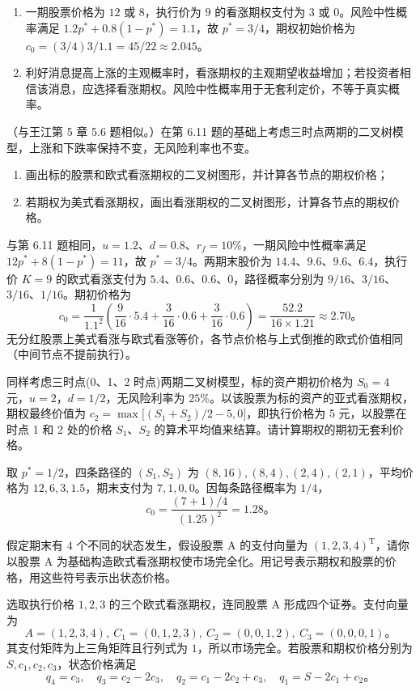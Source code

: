 \begin{solution}
\begin{enumerate}[label=(\alph*)]
\item 一期股票价格为 $12$ 或 $8$，执行价为 $9$ 的看涨期权支付为 $3$ 或 $0$。风险中性概率满足 $1.2p^*+0.8(1-p^*)=1.1$，故 $p^*=3/4$，期权初始价格为 $c_0=(3/4)3/1.1=45/22\approx2.045$。
\item 利好消息提高上涨的主观概率时，看涨期权的主观期望收益增加；若投资者相信该消息，应选择看涨期权。风险中性概率用于无套利定价，不等于真实概率。
\end{enumerate}
\end{solution}
\begin{problem}
（与王江第 5 章 5.6 题相似。）在第 6.11 题的基础上考虑三时点两期的二叉树模型，上涨和下跌率保持不变，无风险利率也不变。
\begin{enumerate}[label=(\alph*)]
    \item 画出标的股票和欧式看涨期权的二叉树图形，并计算各节点的期权价格；
    \item 若期权为美式看涨期权，画出看涨期权的二叉树图形，计算各节点的期权价格。
\end{enumerate}
\end{problem}
\begin{solution}
与第 6.11 题相同，$u=1.2$、$d=0.8$、$r_f=10\%$，一期风险中性概率满足 $12p^*+8(1-p^*)=11$，故 $p^*=3/4$。两期末股价为 $14.4$、$9.6$、$9.6$、$6.4$，执行价 $K=9$ 的欧式看涨支付为 $5.4$、$0.6$、$0.6$、$0$，路径概率分别为 $9/16$、$3/16$、$3/16$、$1/16$。期初价格为
\[
c_0=\frac{1}{1.1^2}\left(\frac{9}{16}\cdot5.4+\frac{3}{16}\cdot0.6+\frac{3}{16}\cdot0.6\right)=\frac{52.2}{16\times1.21}\approx2.70。
\]
无分红股票上美式看涨与欧式看涨等价，各节点价格与上式倒推的欧式价值相同（中间节点不提前执行）。
\end{solution}
\begin{problem}
 同样考虑三时点(0、1、2 时点)两期二叉树模型，标的资产期初价格为 $S_0=4$ 元，$u=2$，$d=1/2$，无风险利率为 $25\%$。以该股票为标的资产的亚式看涨期权，期权最终价值为 $c_2=\max\bigl[(S_1+S_2)/2-5,0\bigr]$，即执行价格为 \num{5} 元，以股票在时点 1 和 2 处的价格 $S_1$、$S_2$ 的算术平均值来结算。请计算期权的期初无套利价格。
\end{problem}
\begin{solution}
取 $p^*=1/2$，四条路径的 $(S_1,S_2)$ 为 $(8,16),(8,4),(2,4),(2,1)$，平均价格为 $12,6,3,1.5$，期末支付为 $7,1,0,0$。因每条路径概率为 $1/4$，
\[
c_0=\frac{(7+1)/4}{(1.25)^2}=1.28。
\]
\end{solution}
\begin{problem}
 假定期末有 $4$ 个不同的状态发生，假设股票 A 的支付向量为 $(1,2,3,4)^{\mathrm{T}}$，请你以股票 A 为基础构造欧式看涨期权使市场完全化。用记号表示期权和股票的价格，用这些符号表示出状态价格。
\end{problem}
\begin{solution}
选取执行价格 $1,2,3$ 的三个欧式看涨期权，连同股票 A 形成四个证券。支付向量为
\[
A=(1,2,3,4),\ C_1=(0,1,2,3),\ C_2=(0,0,1,2),\ C_3=(0,0,0,1)。
\]
其支付矩阵为上三角矩阵且行列式为 $1$，所以市场完全。若股票和期权价格分别为 $S,c_1,c_2,c_3$，状态价格满足
\[
q_4=c_3,\quad q_3=c_2-2c_3,\quad q_2=c_1-2c_2+c_3,\quad q_1=S-2c_1+c_2。
\]
\end{solution}
